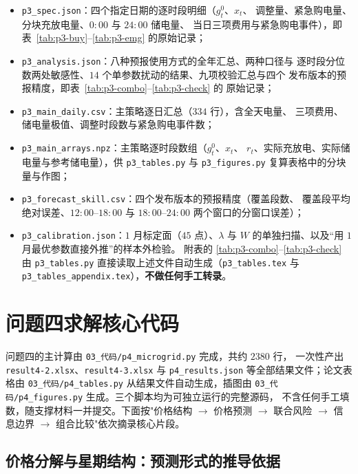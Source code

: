 \documentclass[withoutpreface,bwprint]{cumcmthesis}
\begin{document}
\begin{appendices}
\begin{itemize}
  \item \texttt{p3\_spec.json}：四个指定日期的逐时段明细（$g_t^0$、$x_t$、
        调整量、紧急购电量、分块充放电量、$0{:}00$ 与 $24{:}00$ 储电量、
        当日三项费用与紧急购电事件），即表~\ref{tab:p3-buy}--\ref{tab:p3-emg}
        的原始记录；
  \item \texttt{p3\_analysis.json}：八种预报使用方式的全年汇总、两种口径与
        逐时段分位数两处敏感性、$14$ 个单参数扰动的结果、九项校验汇总与四个
        发布版本的预报精度，即表~\ref{tab:p3-combo}--\ref{tab:p3-check} 的
        原始记录；
  \item \texttt{p3\_main\_daily.csv}：主策略逐日汇总（$334$ 行），含全天电量、
        三项费用、储电量极值、调整时段数与紧急购电事件数；
  \item \texttt{p3\_main\_arrays.npz}：主策略逐时段数组（$g_t^0$、$x_t$、
        $r_t$、实际充放电、实际储电量与参考储电量），供 \texttt{p3\_tables.py}
        与 \texttt{p3\_figures.py} 复算表格中的分块量与作图；
  \item \texttt{p3\_forecast\_skill.csv}：四个发布版本的预报精度（覆盖段数、
        覆盖段平均绝对误差、$12{:}00$--$18{:}00$ 与 $18{:}00$--$24{:}00$
        两个窗口的分窗口误差）；
  \item \texttt{p3\_calibration.json}：$1$ 月标定面（$45$ 点）、$\lambda$ 与
        $W$ 的单独扫描、以及“用 $1$ 月最优参数直接外推”的样本外检验。
        附表的 \ref{tab:p3-combo}--\ref{tab:p3-check} 由 \texttt{p3\_tables.py}
        直接读取上述文件自动生成（\texttt{p3\_tables.tex} 与
        \texttt{p3\_tables\_appendix.tex}），\textbf{不做任何手工转录}。
\end{itemize}



\newpage
\section{问题四求解核心代码}

问题四的主计算由 \texttt{03\_代码/p4\_microgrid.py} 完成，共约 $2380$ 行，
一次性产出 \texttt{result4-2.xlsx}、\texttt{result4-3.xlsx} 与
\texttt{p4\_results.json} 等全部结果文件；论文表格由
\texttt{03\_代码/p4\_tables.py} 从结果文件自动生成，插图由
\texttt{03\_代码/p4\_figures.py} 生成。三个脚本均为可独立运行的完整源码，
不含任何手工填数，随支撑材料一并提交。下面按"价格结构 $\to$ 价格预测
$\to$ 联合风险 $\to$ 信息边界 $\to$ 组合比较"依次摘录核心片段。

\subsection{价格分解与星期结构：预测形式的推导依据}


\end{appendices}
\end{document}
